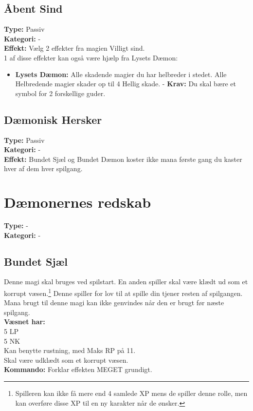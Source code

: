 \subsection{Åbent Sind}
\textbf{Type:} Passiv\\
\textbf{Kategori:} -\\
\textbf{Effekt:} Vælg 2 effekter fra magien Villigt sind.\\
1 af disse effekter kan også være hjælp fra Lysets Dæmon:
\begin{itemize}
    \item \textbf{Lysets Dæmon:} Alle skadende magier du har helbreder i stedet. Alle Helbredende magier skader op til 4 Hellig skade. - \textbf{Krav:} Du skal bære et symbol for 2 forskellige guder.
\end{itemize}

\subsection{Dæmonisk Hersker}
\textbf{Type:} Passiv\\
\textbf{Kategori:} -\\
\textbf{Effekt:} Bundet Sjæl og Bundet Dæmon koster ikke mana første gang du kaster hver af dem hver spilgang.

\section{Dæmonernes redskab}
\textbf{Type:} -\\
\textbf{Kategori:} -\\

\subsection{Bundet Sjæl}
Denne magi skal bruges ved spilstart. En anden spiller skal være klædt ud som et korrupt væsen.\footnote{Spilleren kan ikke få mere end 4 samlede XP mens de spiller denne rolle, men kan overføre disse XP til en ny karakter når de ønsker.} Denne spiller for lov til at spille din tjener resten af spilgangen. Mana brugt til denne magi kan ikke genvindes når den er brugt før næste spilgang.\\
\textbf{Væsnet har:}\\
5 LP\\ 
5 NK\\
Kan benytte rustning, med Maks RP på 11.\\
Skal være udklædt som et korrupt væsen.\\
\textbf{Kommando:} Forklar effekten MEGET grundigt.

